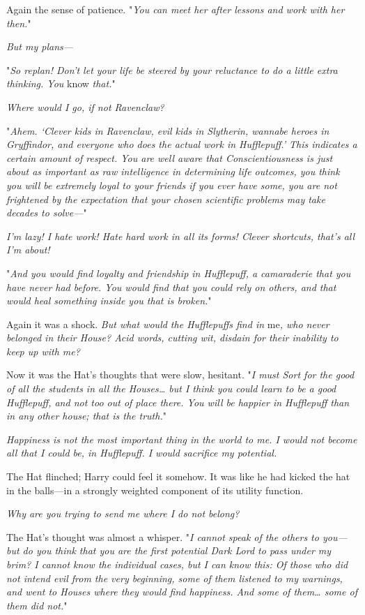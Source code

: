 Again the sense of patience. "\emph{You can meet her after lessons and work 
with her then.}"

\emph{But my plans---}

"\emph{So replan! Don't let your life be steered by your reluctance to do a 
little extra thinking. You} know \emph{that.}"

\emph{Where would I go, if not Ravenclaw?}

"\emph{Ahem. `Clever kids in Ravenclaw, evil kids in Slytherin, wannabe heroes 
in Gryffindor, and everyone who does the actual work in Hufflepuff.' This 
indicates a certain amount of respect. You are well aware that 
Conscientiousness is just about as important as raw intelligence in determining 
life outcomes, you think you will be extremely loyal to your friends if you 
ever have some, you are not frightened by the expectation that your chosen 
scientific problems may take decades to solve---}"

\emph{I'm lazy! I hate work! Hate hard work in all its forms! Clever shortcuts, 
that's all I'm about!}

"\emph{And you would find loyalty and friendship in Hufflepuff, a camaraderie 
that you have never had before. You would find that you could rely on others, 
and that would heal something inside you that is broken.}"

Again it was a shock. \emph{But what would the Hufflepuffs find in} me\emph{, 
who never belonged in their House? Acid words, cutting wit, disdain for their 
inability to keep up with me?}

Now it was the Hat's thoughts that were slow, hesitant. "\emph{I must Sort for 
the good of all the students in all the Houses{\ldots} but I think you could 
learn to be a good Hufflepuff, and not too out of place there. You will be 
happier in Hufflepuff than in any other house; that is the truth.}"

\emph{Happiness is not the most important thing in the world to me. I would not 
become all that I could be, in Hufflepuff. I would sacrifice my potential.}

The Hat flinched; Harry could feel it somehow. It was like he had kicked the 
hat in the balls---in a strongly weighted component of its utility function.

\emph{Why are you trying to send me where I do not belong?}

The Hat's thought was almost a whisper. "\emph{I cannot speak of the others to 
you---but do you think that you are the first potential Dark Lord to pass under 
my brim? I cannot know the individual cases, but I can know this: Of those who 
did not intend evil from the very beginning, some of them listened to my 
warnings, and went to Houses where they would find happiness. And some of 
them{\ldots} some of them did not.}"

